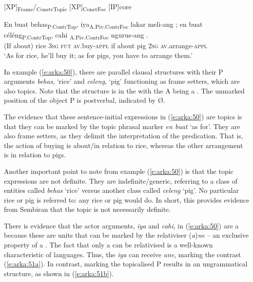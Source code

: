 \documentclass[output=paper
,modfonts
,nonflat]{langsci/langscibook}
\begin{document}
\begin{exe}
	\ex\label{e:arka:49}
	[XP]\textsubscript{Frame}/\textsubscript{ConstrTopic}  [XP]\textsubscript{ConstFoc}   [IP]core 
\end{exe}

\begin{exe}
	\ex\label{e:arka:50}
	\gll {\ob}{\USOParen}En   buat{\USCParen}  behas{\cb}\textsubscript{P.ContrTop},   {\ob}iya{\cb}\textsubscript{A.Piv.ContrFoc}  lakar  meli-ang {\USEmptySet}; {\USOParen}en  buat{\USCParen}  céléng{\cb}\textsubscript{P.ContrTop},   {\ob}cahi{\cb}\textsubscript{ A.Piv.ContrFoc}  ngurus-ang   {\USEmptySet}.\\
	\phantom{[}(If   about)   rice  \phantom{[}3\textsc{sg} \textsc{fut} \textsc{av}.buy-\textsc{appl} {} \phantom{(}if   about   pig     \phantom{[}2\textsc{sg} \textsc{av}.arrange-\textsc{appl}\\
	\glt ‘As for rice, he'll buy it; as for pigs, you have to arrange them.’
\end{exe}

\noindent
In example (\ref{e:arka:50}), there are parallel clausal structures with their P arguments \textit{behas}, ‘rice’ and \textit{celeng}, ‘pig’ functioning as frame setters, which are also  topics. Note that the structure is in the   with the A being a . The unmarked position of the object P is postverbal, indicated by Ø. 

The evidence that these sentence-initial expressions in (\ref{e:arka:50}) are topics is that they can be marked by the topic phrasal marker \textit{en buat} ‘as for’. They are also frame setters, as they delimit the interpretation of the predication. That is, the action of buying is about/in relation to rice, whereas the other arrangement is in relation to pigs. 

Another important point to note from example (\ref{e:arka:50}) is that the topic expressions are not definite. They are indefinite/generic, referring to a class of entities called \textit{behas} ‘rice’ versus another class called \textit{celeng} ‘pig’. No particular rice or pig is referred to: any rice or pig would do. In short, this provides evidence from Sembiran  that the topic is not necessarily definite.

There is evidence that the actor  arguments, \textit{iya} and \textit{cahi}, in (\ref{e:arka:50}) are a  because these are units that can be marked by the  relativiser (\textit{a})\textit{ne} – an exclusive property of a . The fact that only a  can be relativised is a well-known characteristic of  languages. Thus, the  \textit{iya} can receive \textit{ane}, marking the contrast (\ref{e:arka:51a}). In contrast, marking the topicalised P results in an ungrammatical structure, as shown in (\ref{e:arka:51b}). 
\end{document}
